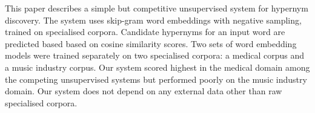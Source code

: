 This paper describes a simple but competitive unsupervised system for hypernym discovery. The system uses skip-gram word embeddings with negative sampling, trained on specialised corpora. Candidate hypernyms for an input word are predicted based based on cosine similarity scores. Two sets of word embedding models were trained separately on two specialised corpora: a medical corpus and a music industry corpus. Our system scored highest in the medical domain among the competing unsupervised systems but performed poorly on the music industry domain. Our system does not depend on any external data other than raw specialised corpora.
